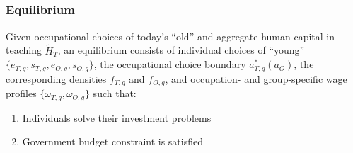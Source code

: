 \documentclass[11pt,hyperref={bookmarks=false},table,aspectratio=169]{beamer}
\begin{document}
\begin{frame}
\begin{itemize}
\begin{align*}
	\end{align*}
\end{itemize}

\end{frame}

\begin{frame}
\frametitle{Equilibrium}
\label{eqm}
Given occupational choices of today's ``old'' and aggregate human capital in teaching $\widetilde{H}_{T}$, an equilibrium consists of individual choices of ``young'' $\{e_{T,g}, s_{T,g}, e_{O,g}, s_{O,g}\}$, the occupational choice boundary $a^*_{T,g}(a_O)$, the corresponding densities $f_{T,g}$ and $f_{O,g}$, and occupation- and group-specific wage profiles $\{\omega_{T,g}, \omega_{O,g}\}$ such that:
\begin{enumerate}
	\item Individuals solve their investment problems \\
	\hyperlink{time_inv}{} \hyperlink{good_inv}{}
	\item Government budget constraint is satisfied
\end{enumerate}

\hfill \hyperlink{laws}{} \\
\hfill \hyperlink{td}{}
\end{frame}
\end{document}
